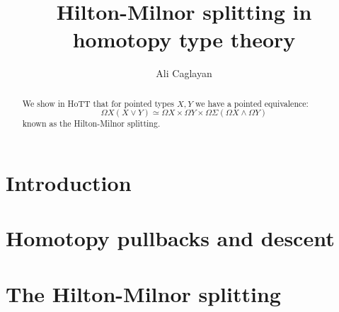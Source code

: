 \documentclass{article}
\title{Hilton-Milnor splitting in homotopy type theory}
\author{Ali Caglayan}
\newcommand{\loops}{\Omega}
\newcommand{\susp}{\Sigma}
\newcommand{\N}{\mathbb{N}}
\theoremstyle{definition}
\begin{document}
    \maketitle

    \begin{abstract}
        We show in HoTT that for pointed types $X, Y$ we have a pointed equivalence:
            \begin{equation*}
                \loops X(X \vee Y) \simeq \loops X \times \loops Y \times \loops \susp (\loops X \wedge \loops Y)
            \end{equation*}
        known as the Hilton-Milnor splitting.
        \begin{comment}
         Observing that this can be iterated we can observe that:
            \begin{equation*}
                \loops \susp (X \vee Y) \simeq \loops \susp X \times \loops \susp Y \times \loops \susp
                    \left(
                        \bigvee_{i, j : \N} X^{\wedge i} \wedge Y^{\wedge j}
                    \right)
            \end{equation*}
        \end{comment}
    \end{abstract}

    \section{Introduction}

    \section{Homotopy pullbacks and descent}
    
    
    \section{The Hilton-Milnor splitting}

    
\end{document}

